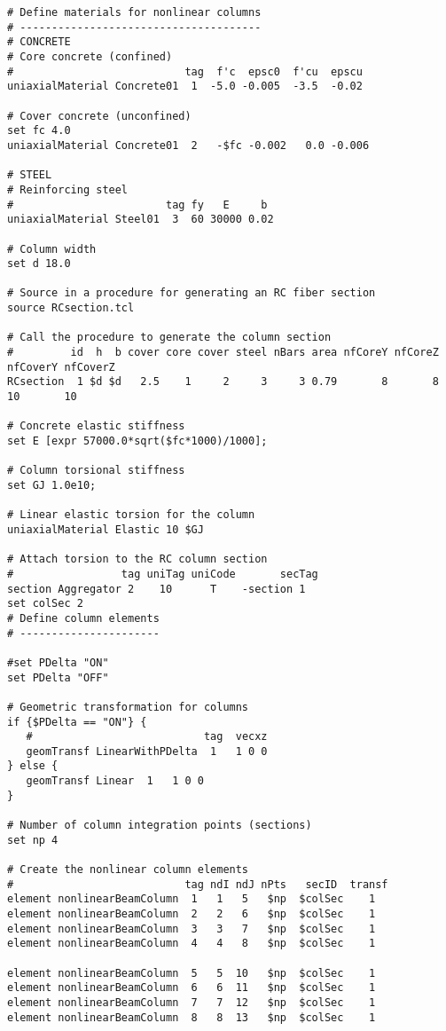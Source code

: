 \documentclass[12pt]{article}
\begin{document}
{\begin{verbatim}
# Define materials for nonlinear columns
# --------------------------------------
# CONCRETE
# Core concrete (confined)
#                           tag  f'c  epsc0  f'cu  epscu
uniaxialMaterial Concrete01  1  -5.0 -0.005  -3.5  -0.02

# Cover concrete (unconfined)
set fc 4.0
uniaxialMaterial Concrete01  2   -$fc -0.002   0.0 -0.006

# STEEL
# Reinforcing steel
#                        tag fy   E     b
uniaxialMaterial Steel01  3  60 30000 0.02

# Column width
set d 18.0

# Source in a procedure for generating an RC fiber section
source RCsection.tcl

# Call the procedure to generate the column section
#         id  h  b cover core cover steel nBars area nfCoreY nfCoreZ nfCoverY nfCoverZ
RCsection  1 $d $d   2.5    1     2     3     3 0.79       8       8       10       10

# Concrete elastic stiffness
set E [expr 57000.0*sqrt($fc*1000)/1000];

# Column torsional stiffness
set GJ 1.0e10;

# Linear elastic torsion for the column
uniaxialMaterial Elastic 10 $GJ

# Attach torsion to the RC column section
#                 tag uniTag uniCode       secTag
section Aggregator 2    10      T    -section 1
set colSec 2
# Define column elements
# ----------------------

#set PDelta "ON"
set PDelta "OFF"

# Geometric transformation for columns
if {$PDelta == "ON"} {
   #                           tag  vecxz
   geomTransf LinearWithPDelta  1   1 0 0
} else {
   geomTransf Linear  1   1 0 0
}

# Number of column integration points (sections)
set np 4

# Create the nonlinear column elements
#                           tag ndI ndJ nPts   secID  transf
element nonlinearBeamColumn  1   1   5   $np  $colSec    1
element nonlinearBeamColumn  2   2   6   $np  $colSec    1
element nonlinearBeamColumn  3   3   7   $np  $colSec    1
element nonlinearBeamColumn  4   4   8   $np  $colSec    1

element nonlinearBeamColumn  5   5  10   $np  $colSec    1
element nonlinearBeamColumn  6   6  11   $np  $colSec    1
element nonlinearBeamColumn  7   7  12   $np  $colSec    1
element nonlinearBeamColumn  8   8  13   $np  $colSec    1


\end{verbatim}}
\end{document}
